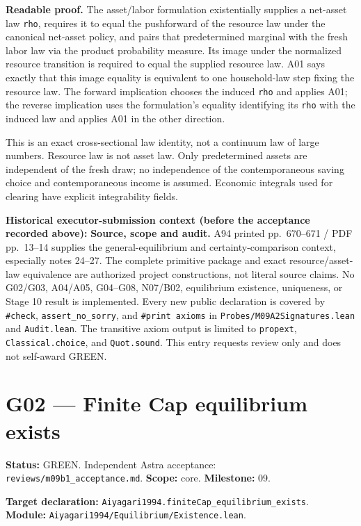 \documentclass[
  11pt,
]{article}
\let\LedgerOriginalTexttt\texttt
\renewcommand{\texttt}[1]{{\small\LedgerOriginalTexttt{#1}}}
\begin{document}
\textbf{Readable proof.} The asset/labor formulation existentially
supplies a net-asset law \texttt{rho}, requires it to equal the
pushforward of the resource law under the canonical net-asset policy,
and pairs that predetermined marginal with the fresh labor law via the
product probability measure. Its image under the normalized resource
transition is required to equal the supplied resource law. A01 says
exactly that this image equality is equivalent to one household-law step
fixing the resource law. The forward implication chooses the induced
\texttt{rho} and applies A01; the reverse implication uses the
formulation's equality identifying its \texttt{rho} with the induced law
and applies A01 in the other direction.

This is an exact cross-sectional law identity, not a continuum law of
large numbers. Resource law is not asset law. Only predetermined assets
are independent of the fresh draw; no independence of the
contemporaneous saving choice and contemporaneous income is assumed.
Economic integrals used for clearing have explicit integrability fields.

\textbf{Historical executor-submission context (before the acceptance
recorded above):} \textbf{Source, scope and audit.} A94 printed
pp.~670--671 / PDF pp.~13--14 supplies the general-equilibrium and
certainty-comparison context, especially notes 24--27. The complete
primitive package and exact resource/asset-law equivalence are
authorized project constructions, not literal source claims. No G02/G03,
A04/A05, G04--G08, N07/B02, equilibrium existence, uniqueness, or Stage
10 result is implemented. Every new public declaration is covered by
\texttt{\#check}, \texttt{assert\_no\_sorry}, and
\texttt{\#print\ axioms} in \texttt{Probes/M09A2Signatures.lean} and
\texttt{Audit.lean}. The transitive axiom output is limited to
\texttt{propext}, \texttt{Classical.choice}, and \texttt{Quot.sound}.
This entry requests review only and does not self-award GREEN.

\section{G02 --- Finite Cap equilibrium
exists}\label{g02-finite-cap-equilibrium-exists}

\textbf{Status:} GREEN. Independent Astra acceptance:
\texttt{reviews/m09b1\_acceptance.md}. \textbf{Scope:} core.
\textbf{Milestone:} 09.

\textbf{Target declaration:}
\texttt{Aiyagari1994.finiteCap\_equilibrium\_exists}.\\
\textbf{Module:} \texttt{Aiyagari1994/Equilibrium/Existence.lean}.
\end{document}
